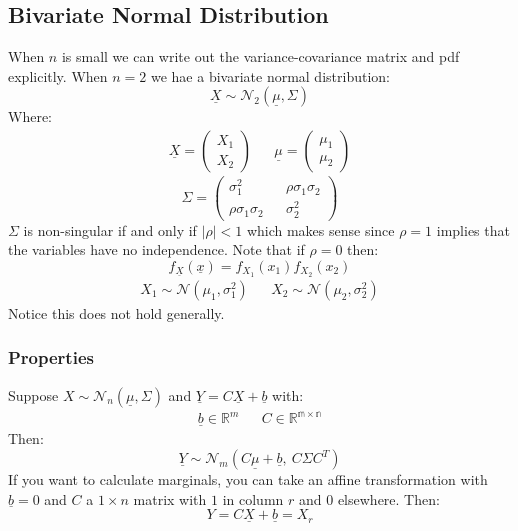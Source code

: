 \documentclass[12pt]{article}
\begin{document}
\subsection{Bivariate Normal Distribution}
When \(n\) is small we can write out the variance-covariance matrix and pdf explicitly. When \(n=2\) we hae a bivariate normal distribution:
\[\underline{X}\sim \mathcal{N}_2(\underline{\mu},\Sigma)\]
Where:
\begin{align*}
    \underline{X}=\begin{pmatrix}
        X_1 \\
        X_2
    \end{pmatrix} && \underline{\mu}=\begin{pmatrix}
        \mu_1 \\
        \mu_2
    \end{pmatrix}
\end{align*}
\[\Sigma=\begin{pmatrix}
    \sigma_1^2 && \rho\sigma_1\sigma_2 \\
    \rho\sigma_1\sigma_2 && \sigma_2^2
\end{pmatrix}\]
\(\Sigma\) is non-singular if and only if \(|\rho|<1\) which makes sense since \(\rho=1\) implies that the variables have no independence. Note that if \(\rho=0\) then:
\[f_{\underline{X}}(\underline{x})=f_{X_1}(x_1)f_{X_2}(x_2)\]
\begin{align*}
    X_1\sim \mathcal{N}(\mu_1,\sigma_1^2) && X_2\sim\mathcal{N}(\mu_2,\sigma_2^2)
\end{align*}
Notice this does not hold generally.
\subsubsection{Properties}
Suppose \(X\sim \mathcal{N}_n(\underline{\mu},\Sigma)\) and \(\underline{Y}=C\underline{X}+\underline{b}\) with:
\begin{align*}
    \underline{b}\in\mathbb{R}^m && C\in\mathbb{\mathbb{R}^{m\times n}}  
\end{align*}
Then:
\[\underline{Y}\sim\mathcal{N}_m(C\underline{\mu}+\underline{b},\  C\Sigma C^T)\]
If you want to calculate marginals, you can take an affine transformation with \(\underline{b}=0\) and \(C\) a \(1\times n\) matrix with \(1\) in column \(r\) and \(0\) elsewhere. Then:
\[Y=C\underline{X}+\underline{b}=X_r\]
\end{document}
